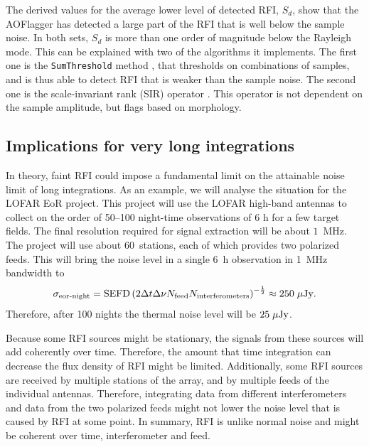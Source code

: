 \documentclass[useAMS,usenatbib]{mn2e}
\begin{document}
The derived values for the average lower level of detected RFI, $S_d$, show that the AOFlagger has detected a large part of the RFI that is well below the sample noise. In both sets, $S_d$ is more than one order of magnitude below the Rayleigh mode. This can be explained with two of the algorithms it implements. The first one is the {\tt SumThreshold} method \citep{post-correlation-rfi-classification}, that thresholds on combinations of samples, and is thus able to detect RFI that is weaker than the sample noise. The second one is the scale-invariant rank (SIR) operator \citep{scale-invariant-rank-operator}. This operator is not dependent on the sample amplitude, but flags based on morphology.

\subsection{Implications for very long integrations}
In theory, faint RFI could impose a fundamental limit on the attainable noise limit of long integrations. As an example, we will analyse the situation for the LOFAR EoR project. This project will use the LOFAR high-band antennas to collect on the order of 50--100 night-time observations of 6 h for a few target fields. The final resolution required for signal extraction will be about $1$~MHz. The project will use about $60$~stations, each of which provides two polarized feeds. This will bring the noise level in a single 6~h observation in 1~MHz bandwidth to
\begin{equation}
 \sigma_\textrm{eor-night} = \textrm{SEFD} \left(2\Delta t \Delta \nu N_\textrm{feed} N_\textrm{interferometers} \right)^{-\frac{1}{2}} \approx 250\hspace{1mm} \mu\textrm{Jy}.
\end{equation}
Therefore, after 100 nights the thermal noise level will be $25\hspace{1mm}\mu\textrm{Jy}$.

Because some RFI sources might be stationary, the signals from these sources will add coherently over time. Therefore, the amount that time integration can decrease the flux density of RFI might be limited. Additionally, some RFI sources are received by multiple stations of the array, and by multiple feeds of the individual antennas. Therefore, integrating data from different interferometers and data from the two polarized feeds might not lower the noise level that is caused by RFI at some point. In summary, RFI is unlike normal noise and might be coherent over time, interferometer and feed.
\end{document}
